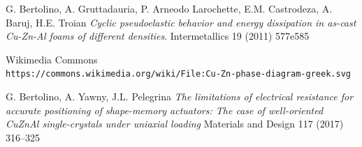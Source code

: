 \documentclass[a4paper,12pt,fleqn,twoside,openany]{book}
\begin{document}
\begin{thebibliography}{3}
G. Bertolino, A. Gruttadauria, P. Arneodo Larochette, E.M. Castrodeza, A. Baruj, H.E. Troian
\textit{Cyclic pseudoelastic behavior and energy dissipation in as-cast Cu-Zn-Al foams of
different densities}.
Intermetallics 19 (2011) 577e585

Wikimedia Commons
\\\texttt{https://commons.wikimedia.org/wiki/File:Cu-Zn-phase-diagram-greek.svg}


G. Bertolino, A. Yawny, J.L. Pelegrina
\textit{The limitations of electrical resistance for accurate positioning of
shape-memory actuators: The case of well-oriented CuZnAl
single-crystals under uniaxial loading}
Materials and Design 117 (2017) 316–325
\end{thebibliography}
\end{document}
